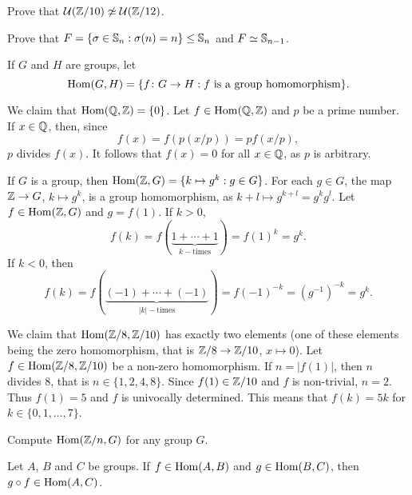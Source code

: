 \begin{exercise}
\label{xca:U(Z/10)}
   Prove that $\mathcal{U}(\mathbb{Z}/10)\not\simeq\mathcal{U}(\mathbb{Z}/12)$.
\end{exercise}

\begin{exercise}
Prove that $F=\{\sigma\in\mathbb{S}_n:\sigma(n)=n\}\leq\mathbb{S}_n$ and $F\simeq\mathbb{S}_{n-1}$.
\end{exercise}

If $G$ and $H$ are groups, let 
\[
\operatorname{Hom}(G,H)=\{f\colon G\to H:f\text{ is a group homomorphism}\}.
\]

\begin{example}
We claim that 
$\operatorname{Hom}(\mathbb{Q},\mathbb{Z})=\{0\}$. Let $f\in\operatorname{Hom}(\mathbb{Q},\mathbb{Z})$ and $p$ be a prime number. 
If $x\in\mathbb{Q}$, then, since 
\[
f(x)=f\left(p(x/p)\right)=pf(x/p),
\]
$p$ divides $f(x)$. It follows that $f(x)=0$ for all
$x\in\mathbb{Q}$, as $p$ is arbitrary. 
\end{example}

\begin{example}
If $G$ is a group, then $\operatorname{Hom}(\mathbb{Z},G)=\{k\mapsto g^k:g\in G\}$.
For each $g\in G$, the map $\mathbb{Z}\to G$, $k\mapsto g^k$, is a group
homomorphism, as 
$k+l\mapsto g^{k+l}=g^kg^l$. Let $f\in\operatorname{Hom}(\mathbb{Z},G)$ and  $g=f(1)$. If $k>0$,
\[
f(k)=f(\underbrace{1+\cdots+1}_{k-\text{times}})=f(1)^k=g^k.
\]
If $k<0$, then
\[
f(k)=f(\underbrace{(-1)+\cdots+(-1)}_{|k|-\text{times}})=f(-1)^{-k}=(g^{-1})^{-k}=g^k.
\]
\end{example}

\begin{example}
We claim that $\operatorname{Hom}(\mathbb{Z}/8,\mathbb{Z}/10)$ has exactly two elements (one of these elements being 
the zero homomorphism, that is $\mathbb{Z}/8\to\mathbb{Z}/10$, $x\mapsto 0$).
Let $f\in\operatorname{Hom}(\mathbb{Z}/8,\mathbb{Z}/10)$ be a non-zero homomorphism. 
If 
$n=|f(1)|$, then 
$n$ divides $8$, that is $n\in\{1,2,4,8\}$. Since $f(1)\in\mathbb{Z}/10$ and
$f$ is non-trivial,
$n=2$. Thus $f(1)=5$ and $f$ is univocally determined. 
This means that 
$f(k)=5k$ for $k\in\{0,1,\dots,7\}$.
\end{example}

\begin{exercise}
Compute $\operatorname{Hom}(\mathbb{Z}/n,G)$ for any group $G$.
\end{exercise}

\begin{exercise}
Let $A$, $B$ and $C$ be groups. If $f\in\operatorname{Hom}(A,B)$ and $g\in\operatorname{Hom}(B,C)$,
then $g\circ f\in\operatorname{Hom}(A,C)$.
\end{exercise}

